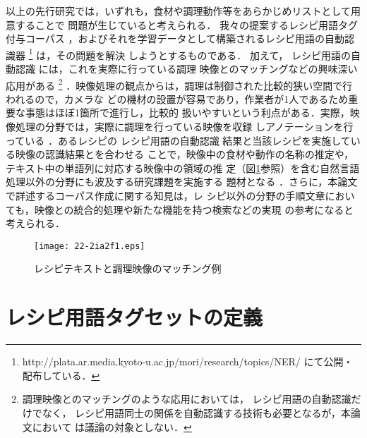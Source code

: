 \documentclass[japanese]{jnlp_1.4}
\begin{document}
以上の先行研究では，いずれも，食材や調理動作等をあらかじめリストとして用意することで
問題が生じていると考えられる．
我々の提案するレシピ用語タグ付与コーパス
，およびそれを学習データとして構築されるレシピ用語の自動認識器
\footnote{http://plata.ar.media.kyoto-u.ac.jp/mori/research/topics/NER/ にて公開・配布している．}
は，その問題を解決
しようとするものである．
加えて，
レシピ用語の自動認識
には，これを実際に行っている調理
映像とのマッチングなどの興味深い応用がある
\footnote{調理映像とのマッチングのような応用においては，
レシピ用語の自動認識だけでなく，
レシピ用語同士の関係を自動認識する技術も必要となるが，本論文において
は議論の対象としない．}
\cite{料理映像の構造解析による調理手順との対
応付け}．映像処理の観点からは，調理は制御された比較的狭い空間で行われるので，カメラな
どの機材の設置が容易であり，作業者が1人であるため重要な事態はほぼ1箇所で進行し，比較的
扱いやすいという利点がある．実際，映像処理の分野では，実際に調理を行っている映像を収録
しアノテーションを行っている
\cite{調理行動モデル化のための調理観測映像へのアノテーション}
．あるレシピの
レシピ用語の自動認識
結果と当該レシピを実施している映像の認識結果とを合わせる
ことで，映像中の食材や動作の名称の推定や，テキスト中の単語列に対応する映像中の領域の推
定（図\ref{figure_0001}参照）を含む自然言語処理以外の分野にも波及する研究課題を実施する
題材となる
．さらに，本論文で詳述するコーパス作成に関する知見は，レ
シピ以外の分野の手順文章においても，映像との統合的処理や新たな機能を持つ検索などの実現
の参考になると考えられる．

\begin{figure}[t]
  \begin{center}
\texttt{[image: 22-2ia2f1.eps]}
  \end{center}
  \caption{レシピテキストと調理映像のマッチング例}
  \label{figure_0001}
\end{figure}


\section{レシピ用語タグセットの定義}
\label{nestd}
\end{document}
